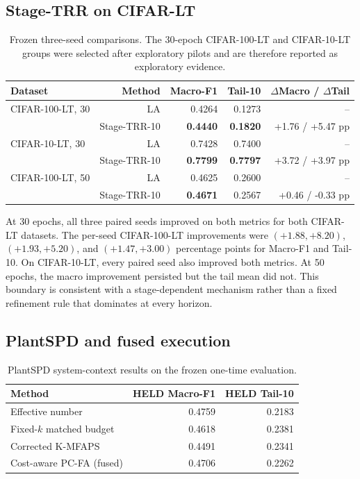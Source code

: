 \documentclass[10pt,letterpaper]{article}
\begin{document}
\subsection{Stage-TRR on CIFAR-LT}
\begin{table}[t]
\centering
\caption{Frozen three-seed comparisons. The 30-epoch CIFAR-100-LT and CIFAR-10-LT groups were selected after exploratory pilots and are therefore reported as exploratory evidence.}
\label{tab:cifar}
\begin{tabular}{lrrrr}
\toprule
Dataset & Method & Macro-F1 & Tail-10 & $\Delta$Macro / $\Delta$Tail \\
\midrule
CIFAR-100-LT, 30 & LA & 0.4264 & 0.1273 & -- \\
 & Stage-TRR-10 & \textbf{0.4440} & \textbf{0.1820} & +1.76 / +5.47 pp \\
\midrule
CIFAR-10-LT, 30 & LA & 0.7428 & 0.7400 & -- \\
 & Stage-TRR-10 & \textbf{0.7799} & \textbf{0.7797} & +3.72 / +3.97 pp \\
\midrule
CIFAR-100-LT, 50 & LA & 0.4625 & 0.2600 & -- \\
 & Stage-TRR-10 & \textbf{0.4671} & 0.2567 & +0.46 / -0.33 pp \\
\bottomrule
\end{tabular}
\end{table}

At 30 epochs, all three paired seeds improved on both metrics for both CIFAR-LT datasets. The per-seed CIFAR-100-LT improvements were $(+1.88,+8.20)$, $(+1.93,+5.20)$, and $(+1.47,+3.00)$ percentage points for Macro-F1 and Tail-10. On CIFAR-10-LT, every paired seed also improved both metrics. At 50 epochs, the macro improvement persisted but the tail mean did not. This boundary is consistent with a stage-dependent mechanism rather than a fixed refinement rule that dominates at every horizon.

\subsection{PlantSPD and fused execution}
\begin{table}[t]
\centering
\caption{PlantSPD system-context results on the frozen one-time evaluation.}
\label{tab:plants}
\begin{tabular}{lrr}
\toprule
Method & HELD Macro-F1 & HELD Tail-10 \\
\midrule
Effective number & 0.4759 & 0.2183 \\
Fixed-$k$ matched budget & 0.4618 & 0.2381 \\
Corrected K-MFAPS & 0.4491 & 0.2341 \\
Cost-aware PC-FA (fused) & 0.4706 & 0.2262 \\
\bottomrule
\end{tabular}
\end{table}
\end{document}
